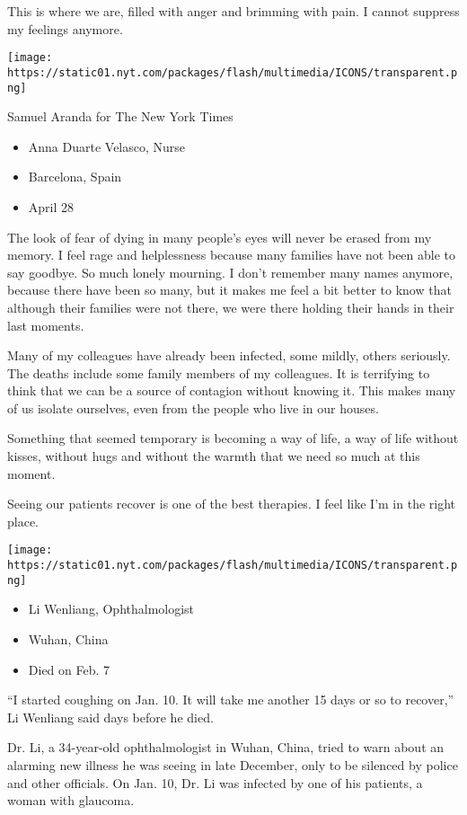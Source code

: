 This is where we are, filled with anger and brimming with pain. I cannot
suppress my feelings anymore.

\texttt{[image: https://static01.nyt.com/packages/flash/multimedia/ICONS/transparent.png]}

Samuel Aranda for The New York Times

\begin{itemize}
\tightlist
\item
  Anna Duarte Velasco, Nurse
\item
  Barcelona, Spain
\item
  April 28
\end{itemize}

The look of fear of dying in many people's eyes will never be erased
from my memory. I feel rage and helplessness because many families have
not been able to say goodbye. So much lonely mourning. I don't remember
many names anymore, because there have been so many, but it makes me
feel a bit better to know that although their families were not there,
we were there holding their hands in their last moments.

Many of my colleagues have already been infected, some mildly, others
seriously. The deaths include some family members of my colleagues. It
is terrifying to think that we can be a source of contagion without
knowing it. This makes many of us isolate ourselves, even from the
people who live in our houses.

Something that seemed temporary is becoming a way of life, a way of life
without kisses, without hugs and without the warmth that we need so much
at this moment.

Seeing our patients recover is one of the best therapies. I feel like
I'm in the right place.

\texttt{[image: https://static01.nyt.com/packages/flash/multimedia/ICONS/transparent.png]}

\begin{itemize}
\tightlist
\item
  Li Wenliang, Ophthalmologist
\item
  Wuhan, China
\item
  Died on Feb. 7
\end{itemize}

``I started coughing on Jan. 10. It will take me another 15 days or so
to recover,'' Li Wenliang said days before he died.

Dr. Li, a 34-year-old ophthalmologist in Wuhan, China, tried to warn
about an alarming new illness he was seeing in late December, only to be
silenced by police and other officials. On Jan. 10, Dr. Li was infected
by one of his patients, a woman with glaucoma.

